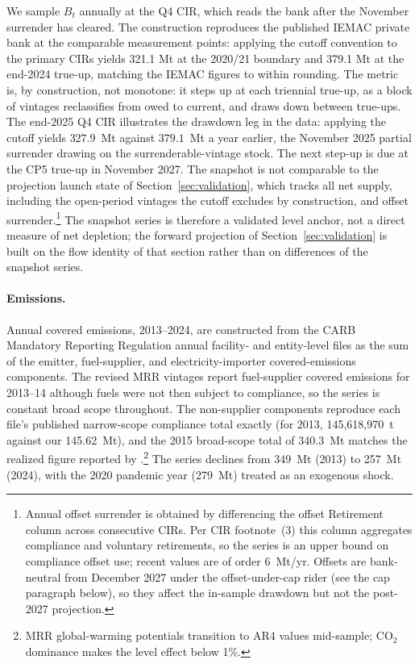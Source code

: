 \documentclass[11pt,letterpaper]{article}
\theoremstyle{plain}
\theoremstyle{definition}
\numberwithin{equation}{section}
\begin{document}
We sample $B_t$ annually at the Q4 CIR, which reads the bank after the November surrender has cleared. The construction reproduces the published IEMAC private bank at the comparable measurement points: applying the cutoff convention to the primary CIRs yields 321.1 Mt at the 2020/21 boundary and 379.1 Mt at the end-2024 true-up, matching the IEMAC figures to within rounding. The metric is, by construction, not monotone: it steps up at each triennial true-up, as a block of vintages reclassifies from owed to current, and draws down between true-ups. The end-2025 Q4 CIR illustrates the drawdown leg in the data: applying the cutoff yields $327.9$~Mt against $379.1$~Mt a year earlier, the November 2025 partial surrender drawing on the surrenderable-vintage stock. The next step-up is due at the CP5 true-up in November 2027. The snapshot is not comparable to the projection launch state of Section~\ref{sec:validation}, which tracks all net supply, including the open-period vintages the cutoff excludes by construction, and offset surrender.\footnote{Annual offset surrender is obtained by differencing the offset Retirement column across consecutive CIRs. Per CIR footnote~(3) this column aggregates compliance and voluntary retirements, so the series is an upper bound on compliance offset use; recent values are of order 6~Mt/yr. Offsets are bank-neutral from December 2027 under the offset-under-cap rider (see the cap paragraph below), so they affect the in-sample drawdown but not the post-2027 projection.} The snapshot series is therefore a validated level anchor, not a direct measure of net depletion; the forward projection of Section~\ref{sec:validation} is built on the flow identity of that section rather than on differences of the snapshot series.
 
\paragraph{Emissions.} Annual covered emissions, 2013--2024, are constructed from the CARB Mandatory Reporting Regulation annual facility- and entity-level files as the sum of the emitter, fuel-supplier, and electricity-importer covered-emissions components. The revised MRR vintages report fuel-supplier covered emissions for 2013--14 although fuels were not then subject to compliance, so the series is constant broad scope throughout. The non-supplier components reproduce each file's published narrow-scope compliance total exactly (for 2013, 145{,}618{,}970~t against our 145.62~Mt), and the 2015 broad-scope total of 340.3~Mt matches the realized figure reported by \citet{borenstein2019}.\footnote{MRR global-warming potentials transition to AR4 values mid-sample; $\mathrm{CO}_2$ dominance makes the level effect below 1\%.} The series declines from 349~Mt (2013) to 257~Mt (2024), with the 2020 pandemic year (279~Mt) treated as an exogenous shock.
 
\end{document}
